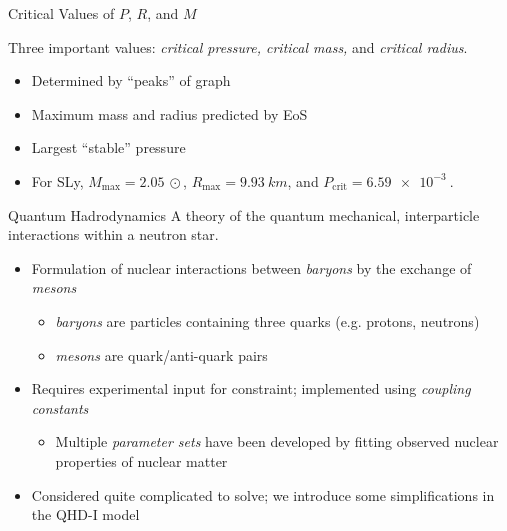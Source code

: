 \documentclass[handout]{beamer}
\begin{document}
\begin{frame}{Critical Values of $P$, $R$, and $M$}
\begin{figure}[h!]
\begin{subfigure}{.5\textwidth}
            \end{subfigure}
        \end{figure} \pause
        Three important values: \pause \textit{critical pressure, critical mass,} and \textit{critical radius}. \pause 
        \begin{itemize}
            \item Determined by ``peaks'' of graph \pause
            \item Maximum mass and radius predicted by EoS \pause
            \item Largest ``stable'' pressure \pause
            \item For SLy, $M_\text{max} = \SI{2.05}{\odot}$, $R_\text{max} = \SI{9.93}{km}$, and $P_\text{crit} = \SI{6.59e-3}{}$.
        \end{itemize}

    \end{frame}

    \begin{frame}{Quantum Hadrodynamics}
        \pause
        A theory of the quantum mechanical, interparticle interactions within a neutron star. \pause
        \begin{itemize}
            \item Formulation of nuclear interactions between \textit{baryons} by the exchange of \textit{mesons} \pause \begin{itemize}
                \item \textit{baryons} are particles containing three quarks (e.g. protons, neutrons) \pause
                \item \textit{mesons} are quark/anti-quark pairs \pause
            \end{itemize}
            \item Requires experimental input for constraint; \pause implemented using \textit{coupling constants} \pause \begin{itemize}
                \item Multiple \textit{parameter sets} have been developed by fitting observed nuclear properties of nuclear matter \pause
            \end{itemize}
            \item Considered quite complicated to solve\pause ; we introduce some simplifications in the QHD-I model
        \end{itemize}
    \end{frame}
\end{document}
